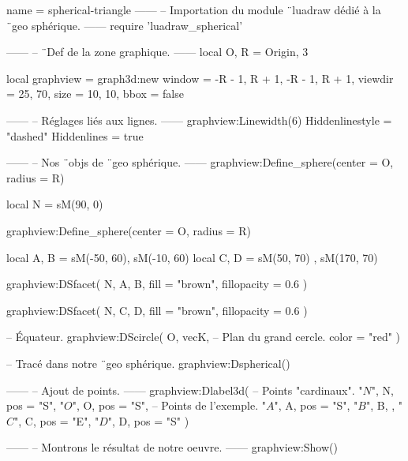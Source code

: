 \documentclass[border = 3pt]{standalone}
\begin{document}
\begin{luadraw*}{name = spherical-triangle}
------
-- Importation du module ¨luadraw dédié à la ¨geo sphérique.
------
require 'luadraw_spherical'

------
-- ¨Def de la zone graphique.
------
local O, R = Origin, 3

local graphview = graph3d:new{
  window  = {-R - 1, R + 1, -R - 1, R + 1},
  viewdir = {25, 70},
  size    = {10, 10},
  bbox    = false
}

------
-- Réglages liés aux lignes.
------
graphview:Linewidth(6)
Hiddenlinestyle = "dashed"
Hiddenlines     = true

------
-- Nos ¨objs de ¨geo sphérique.
------
graphview:Define_sphere({center = O, radius = R})

local N = sM(90, 0)

graphview:Define_sphere({center = O, radius = R})

local A, B = sM(-50, 60), sM(-10, 60)
local C, D = sM(50, 70) , sM(170, 70)

graphview:DSfacet(
  {N, A, B},
  {fill = "brown", fillopacity = 0.6}
)

graphview:DSfacet(
  {N, C, D},
  {fill = "brown", fillopacity = 0.6}
)

-- Équateur.
graphview:DScircle(
  {O, vecK},       -- Plan du grand cercle.
  {color = "red"}
)

-- Tracé dans notre ¨geo sphérique.
graphview:Dspherical()

------
-- Ajout de points.
------
graphview:Dlabel3d(
-- Points "cardinaux".
  "$N$", N, {pos = "S"},
  "$O$", O, {pos = "S"},
-- Points de l'exemple.
  "$A$", A, {pos = "S"},
  "$B$", B, {},
  "$C$", C, {pos = "E"},
  "$D$", D, {pos = "S"}
)

------
-- Montrons le résultat de notre oeuvre.
------
graphview:Show()
\end{luadraw*}
\end{document}
